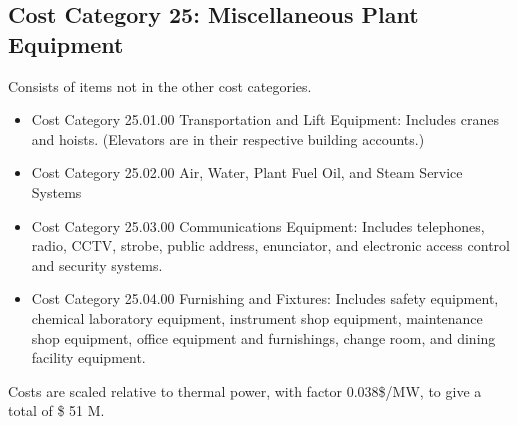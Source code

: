 \subsection{Cost Category 25: Miscellaneous Plant Equipment}  %

Consists of items not in the other cost categories.

\begin{itemize}

\item Cost Category 25.01.00 Transportation and Lift Equipment: Includes cranes and hoists. (Elevators are in their respective building accounts.)

\item  Cost Category 25.02.00 Air, Water, Plant Fuel Oil, and Steam Service Systems

\item  Cost Category 25.03.00 Communications Equipment: Includes telephones, radio, CCTV, strobe, public address, enunciator, and electronic access control and security systems.

\item  Cost Category 25.04.00 Furnishing and Fixtures: Includes safety equipment, chemical laboratory equipment, instrument shop equipment, maintenance shop equipment, office equipment and furnishings, change room, and dining facility equipment.

\end{itemize}

Costs are scaled relative to thermal power, with factor 0.038\$/MW, to give a total of \$ 51 M. 
